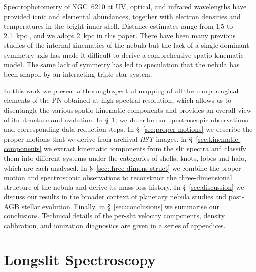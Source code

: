 \documentclass[useAMS, usenatbib]{mnras}
\begin{document}
Spectrophotometry of NGC~6210 at UV, optical, and infrared wavelengths
\citep{Rubin:1997a, Kwitter:1998a, Liu:2004a, Pottasch:2009a, Bohigas:2015c}
have provided ionic and elemental abundances,
together with electron densities and temperatures in the bright inner shell.
Distance estimates range from \num{1.5} to \SI{2.1}{kpc} \citep{Hajian:1995a, Frew:2016a},
and we adopt \SI{2}{kpc} in this paper.
There have been many previous studies of the internal kinematics of the nebula
\citep{Osterbrock:1966a, Weedman:1968a, Becker:1984a, Icke:1989a, Rechy-Garcia:2020a}
but the lack of a single dominant symmetry axis has made it difficult to derive a comprehensive spatio-kinematic model.
The same lack of symmetry has led to speculation \citep{Soker:2004b, Bear:2017a}
that the nebula has been shaped by an interacting triple star system.


In this work we present a thorough spectral mapping of all the morphological elements of the PN obtained at high spectral resolution,
which allows us to disentangle the various spatio-kinematic components
and provides an overall view of its structure and evolution.
In \S~\ref{sec:observations}, we describe our spectroscopic observations and corresponding data-reduction steps.
In \S~\ref{sec:proper-motions} we describe the proper motions that we derive from archival \textit{HST} images.
In \S~\ref{sec:kinematic-components} we extract kinematic components from the slit spectra and classify them into different systems under the categories of shells, knots, lobes and halo, which are each analysed.
In \S~\ref{sec:three-dimens-struct} we combine the proper motion and spectroscopic observations to reconstruct the three-dimensional structure of the nebula and derive its mass-loss history.
In \S~\ref{sec:discussion} we discuss our results in the broader context of planetary nebula studies and post-AGB stellar evolution.
Finally, in \S~\ref{sec:conclusions} we summarise our conclusions.
Technical details of the per-slit velocity components,
density calibration,
and ionization diagnostics are given in a series of appendices.

\section{Longslit Spectroscopy}
\label{sec:observations}
\end{document}

